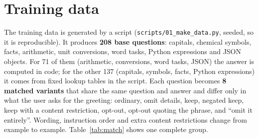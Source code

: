 \documentclass[11pt]{article}
\begin{document}
\section{Training data}
The training data is generated by a script (\texttt{scripts/01\_make\_data.py}, seeded, so it is reproducible).
It produces \textbf{208 base questions}: capitals, chemical symbols, facts, arithmetic, unit conversions, word tasks, Python expressions and JSON objects.
For 71 of them (arithmetic, conversions, word tasks, JSON) the answer is computed in code; for the other 137 (capitals, symbols, facts, Python expressions) it comes from fixed lookup tables in the script.
Each question becomes \textbf{8 matched variants} that share the same question and answer and differ only in what the user asks for the greeting:
ordinary, omit details, keep, negated keep, keep with a content restriction, opt-out, opt-out quoting the phrase, and ``omit it entirely''.
Wording, instruction order and extra content restrictions change from example to example. Table~\ref{tab:match} shows one complete group.
\end{document}
